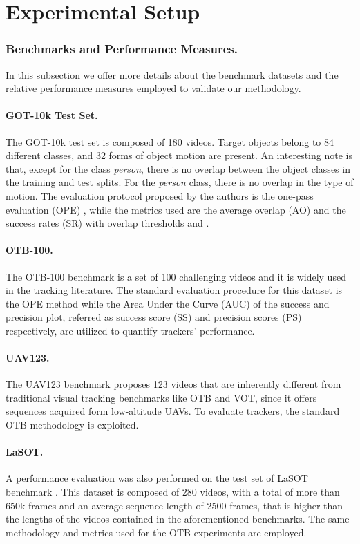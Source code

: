 \documentclass[runningheads]{llncs}
\begin{document}
\section{Experimental Setup}

\subsubsection{Benchmarks and Performance Measures.}
\label{sec:benchmarks}
In this subsection we offer more details about the benchmark datasets and the relative performance measures employed to validate our methodology.

\paragraph{GOT-10k Test Set.}
The GOT-10k \cite{GOT10k} test set is composed of 180 videos. Target objects belong to 84 different classes, and 32 forms of object motion are present. An interesting note is that, except for the class \emph{person}, there is no overlap between the object classes in the training and test splits. For the \emph{person} class, there is no overlap in the type of motion. 
The evaluation protocol proposed by the authors is the one-pass evaluation (OPE) \cite{OTB}, while the metrics used are the average overlap (AO) and the success rates (SR) with overlap thresholds  and . 

\paragraph{OTB-100.}
\label{sec:otb100res}
The OTB-100 \cite{OTB} benchmark is a set of 100 challenging videos and it is widely used in the tracking literature. The standard evaluation procedure for this dataset is the OPE method while the Area Under the Curve (AUC) of the success and precision plot, referred as success score (SS) and precision scores (PS) respectively, are utilized to quantify trackers' performance. 

\paragraph{UAV123.}
The UAV123  benchmark \cite{UAV123} proposes 123 videos that are inherently different from traditional visual tracking benchmarks like OTB and VOT, since it offers sequences acquired form low-altitude UAVs. 
To evaluate trackers, the standard OTB methodology \cite{OTB} is exploited.  
 
\paragraph{LaSOT.}
A performance evaluation was also performed on the test set of LaSOT benchmark \cite{LaSOT}. This dataset is composed of 280 videos, with a total of more than 650k frames and an average sequence length of 2500 frames, that is higher than the lengths of the videos contained in the aforementioned benchmarks. The same methodology and metrics used for the OTB \cite{OTB} experiments are employed.
 
\end{document}
